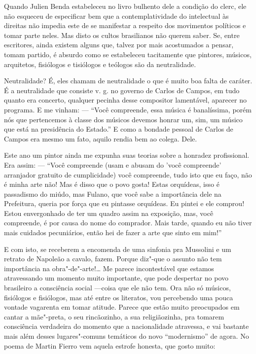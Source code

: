 Quando Julien Benda estabeleceu no livro bulhento dele a condição do
clerc, ele não esqueceu de especificar bem que a contemplatividade do
intelectual às direitas não impedia este de se manifestar a respeito dos
movimentos políticos e tomar parte neles. Mas disto os cultos
brasilianos não querem saber. Se, entre escritores, ainda existem alguns
que, talvez por mais acostumados a pensar, tomam partido, é absurdo como
se estabeleceu tacitamente que pintores, músicos, arquitetos, fisiólogos
e tisiólogos e teólogos são da neutralidade.

Neutralidade? É, eles chamam de neutralidade o que é muito boa falta de
caráter. É a neutralidade que consiste v. g. no governo de Carlos de
Campos, em tudo quanto era concerto, qualquer pecinha desse compositor
lamentável, aparecer no programa. E me vinham: --- ``Você compreende, essa
música é banalíssima, porém nós que pertencemos à classe dos músicos
devemos honrar um, sim, um músico que está na presidência do Estado.'' E
como a bondade pessoal de Carlos de Campos era mesmo um fato, aquilo
rendia bem ao colega. Dele.

Este ano um pintor ainda me expunha suas teorias sobre a honradez
profissional. Era assim: --- ``Você compreende (usam e abusam do 'você
compreende' arranjador gratuito de cumplicidade) você compreende, tudo
isto que eu faço, não é minha arte não! Mas é disso que o povo gosta!
Estas orquídeas, isso é passadismo do miúdo, mas Fulano, que você sabe a
importância dele na Prefeitura, queria por força que eu pintasse
orquídeas. Eu pintei e ele comprou! Estou envergonhado de ter um quadro
assim na exposição, mas, você compreende, é por causa do nome do
comprador. Mais tarde, quando eu não tiver mais cuidados pecuniários,
então hei de fazer a arte que sinto em mim!''

E com isto, se receberem a encomenda de uma sinfonia pra Mussolini e um
retrato de Napoleão a cavalo, fazem. Porque diz"-que o assunto não tem
importância na obra"-de"-arte!\ldots{} Me parece incontestável que estamos
atravessando um momento muito importante, que pode despertar no povo
brasileiro a consciência social ---coisa que ele não tem. Ora não só
músicos, fisiólogos e fisiólogos, mas até entre os literatos, vou
percebendo uma pouca vontade vagarenta em tomar atitude. Parece que
estão muito preocupados em cantar a mãe"-preta, o seu rincãozinho, a sua
religiãozinha, pra tomarem consciência verdadeira do momento que a
nacionalidade atravessa, e vai bastante mais além desses lugares"-comuns
temáticos do novo ``modernismo'' de agora. No poema de Martin Fierro vem
aquela estrofe honesta, que gosto muito:

